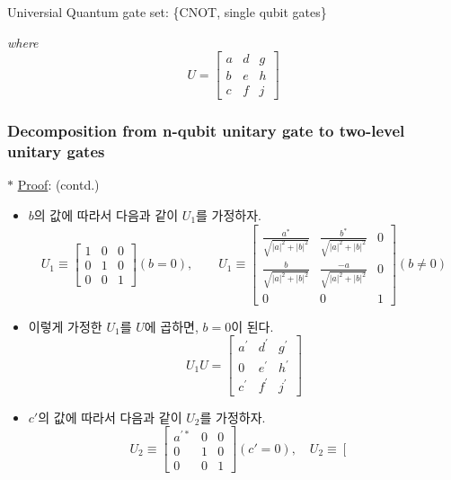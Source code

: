 \documentclass[9pt]{beamer}
\begin{document}
\begin{section}{Universial Quantum gate set: \{CNOT, single qubit gates\}}
\begin{frame}
            \textit{where} 
            $$
            U=\left[\begin{array}{lll}
            a & d & g \\
            b & e & h \\
            c & f & j
            \end{array}\right]
            $$
        \end{frame}
        \begin{frame}
            \frametitle{Decomposition from n-qubit unitary gate to two-level unitary gates}
                $\ast$ \underline{Proof}: (contd.)
                \begin{itemize}
                    \item $b$의 값에 따라서 다음과 같이 $U_1$를 가정하자.
                    $$ U_1 \equiv\left[\begin{array}{lll} 1 & 0 & 0 \\ 0 & 1 & 0 \\ 0 & 0 & 1 \end{array}\right](b=0),\qquad
                    U_1 \equiv\left[\begin{array}{ccc}
                    \frac{a^*}{\sqrt{|a|^2+|b|^2}} & \frac{b^*}{\sqrt{|a|^2+|b|^2}} & 0 \\
                    \frac{b}{\sqrt{|a|^2+|b|^2}} & \frac{-a}{\sqrt{|a|^2+|b|^2}} & 0 \\
                    0 & 0 & 1
                    \end{array}\right] (b \ne 0) $$
                    \item 이렇게 가정한 $U_1$를 $U$에 곱하면, $b=0$이 된다.
                    $$
                    U_1 U=\left[\begin{array}{ccc}
                    a^{\prime} & d^{\prime} & g^{\prime} \\
                    0 & e^{\prime} & h^{\prime} \\
                    c^{\prime} & f^{\prime} & j^{\prime}
                    \end{array}\right]
                    $$
                    \item $c'$의 값에 따라서 다음과 같이 $U_2$를 가정하자.
                    $$U_2 \equiv\left[\begin{array}{ccc} a^{\prime *} & 0 & 0 \\ 0 & 1 & 0 \\ 0 & 0 & 1 \end{array}\right] (c'=0), \quad U_2 \equiv\left[\begin{array}{ccc}

\end{array}$$
\end{itemize}
\end{frame}
\end{section}
\end{document}
